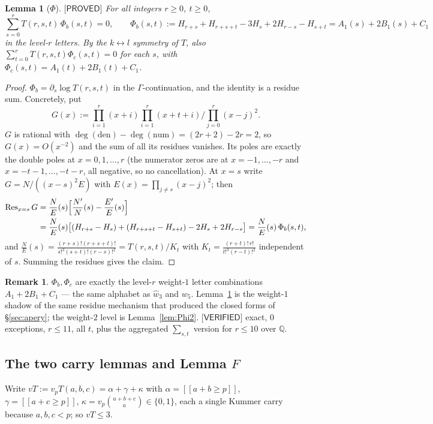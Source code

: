 \documentclass[11pt,reqno]{amsart}
\theoremstyle{plain}
\newtheorem{lemma}[theorem]{Lemma}
\theoremstyle{definition}
\newtheorem{remark}[theorem]{Remark}
\theoremstyle{remark}
\numberwithin{equation}{section}
\newcommand{\QQ}{\mathbb{Q}}
\newcommand{\Res}{\operatorname{Res}}
\newcommand{\ii}[1]{[\![#1]\!]}
\newcommand{\wfive}{w_5}
\newcommand{\wthree}{\hat w_3}
\newcommand{\PROVED}{\textsf{[PROVED]}}
\newcommand{\VERIFIED}{\textsf{[VERIFIED]}}
\begin{document}
\begin{lemma}[$\Phi$]\label{lem:Phi}
$\PROVED$ For all integers $r\ge0$, $t\ge0$,
\[
\sum_{s=0}^{r}T(r,s,t)\,\Phi_b(s,t)=0,\qquad
\Phi_b(s,t):=H_{r+s}+H_{r+s+t}-3H_s+2H_{r-s}-H_{s+t}=A_1(s)+2B_1(s)+C_1
\]
in the level-$r$ letters. By the $k\leftrightarrow l$ symmetry of $T$, also
$\sum_{t=0}^{r}T(r,s,t)\Phi_c(s,t)=0$ for each $s$, with $\Phi_c(s,t)=A_1(t)+2B_1(t)+C_1$.
\end{lemma}

\begin{proof}
$\Phi_b=\partial_s\log T(r,s,t)$ in the $\Gamma$-continuation, and the identity is a residue
sum. Concretely, put
\[
G(x):=\prod_{i=1}^{r}(x+i)\prod_{i=1}^{r}(x+t+i)\Big/\prod_{j=0}^{r}(x-j)^2 .
\]
$G$ is rational with $\deg(\mathrm{den})-\deg(\mathrm{num})=(2r+2)-2r=2$, so $G(x)=O(x^{-2})$
and the sum of all its residues vanishes. Its poles are exactly the double poles at
$x=0,1,\dots,r$ (the numerator zeros are at $x=-1,\dots,-r$ and $x=-t-1,\dots,-t-r$, all
negative, so no cancellation). At $x=s$ write $G=N/((x-s)^2E)$ with $E(x)=\prod_{j\ne s}(x-j)^2$;
then
\[
\begin{aligned}
\Res_{x=s}G&=\frac NE(s)\Bigl[\frac{N'}{N}(s)-\frac{E'}{E}(s)\Bigr]\\
&=\frac NE(s)\bigl[(H_{r+s}-H_s)+(H_{r+s+t}-H_{s+t})-2H_s+2H_{r-s}\bigr]
=\frac NE(s)\,\Phi_b(s,t),
\end{aligned}
\]
and $\frac NE(s)=\frac{(r+s)!(r+s+t)!}{s!^3(s+t)!(r-s)!^2}=T(r,s,t)/K_t$ with
$K_t=\frac{(r+t)!\,r!}{t!^3(r-t)!^2}$ independent of $s$. Summing the residues gives the claim.
\end{proof}

\begin{remark}
$\Phi_b,\Phi_c$ are exactly the level-$r$ weight-$1$ letter combinations $A_1+2B_1+C_1$ ---
the same alphabet as $\wthree$ and $\wfive$. Lemma~\ref{lem:Phi} is the weight-$1$ shadow of
the same residue mechanism that produced the closed forms of \S\ref{sec:apery}; the weight-$2$
level is Lemma~\ref{lem:Phi2}. $\VERIFIED$ exact, $0$ exceptions, $r\le11$, all $t$, plus the
aggregated $\sum_{s,t}$ version for $r\le10$ over $\QQ$.
\end{remark}

\subsection{The two carry lemmas and Lemma \texorpdfstring{$F$}{F}}

Write $vT:=v_pT(a,b,c)=\alpha+\gamma+\kappa$ with $\alpha=\ii{a+b\ge p}$,
$\gamma=\ii{a+c\ge p}$, $\kappa=v_p\binom{a+b+c}{a}\in\{0,1\}$, each a single Kummer carry
because $a,b,c<p$; so $vT\le3$.
\end{document}
